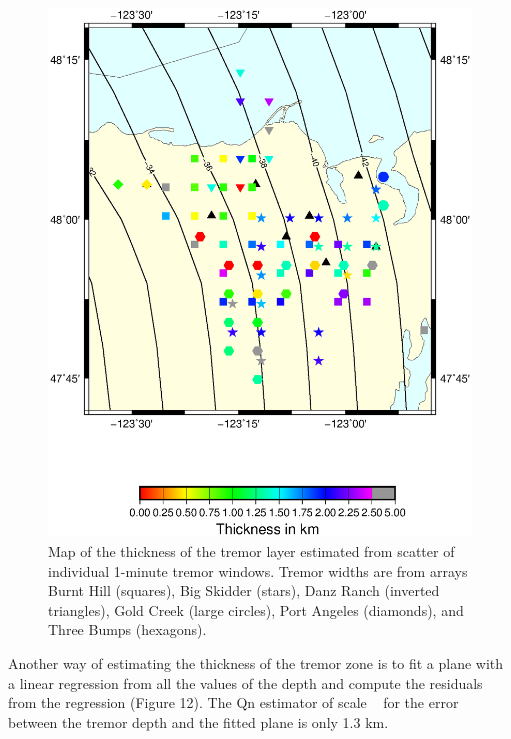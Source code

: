 \documentclass[draft]{agujournal2019}
\begin{document}
\begin{figure}
\noindent\includegraphics[width=\textwidth, trim={1cm 5cm 3.5cm 4cm},clip]{figures/Q_PWS_PWS.eps}
\caption{Map of the thickness of the tremor layer estimated from scatter of individual 1-minute tremor windows. Tremor widths are from arrays Burnt Hill (squares), Big Skidder (stars), Danz Ranch (inverted triangles),  Gold Creek (large circles), Port Angeles (diamonds), and Three Bumps (hexagons).}
\label{pngfiguresample}
\end{figure}

Another way of estimating the thickness of the tremor zone is to fit a plane with a linear regression from all the values of the depth and compute the residuals from the regression (Figure 12). The Qn estimator of scale ~\cite{ROU_1993} for the error between the tremor depth and the fitted plane is only 1.3 km. \\
\end{document}
